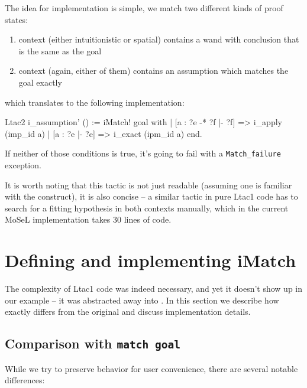 The idea for implementation is simple, we match two different kinds of proof states:
\begin{enumerate}
\item context (either intuitionistic or spatial) contains a wand with conclusion that is the same as the goal
\item context (again, either of them) contains an assumption which matches the goal exactly
\end{enumerate}

which translates to the following implementation:

\begin{minipage}{\linewidth}
\begin{coq}
Ltac2 i_assumption' () :=
  iMatch! goal with
  | [a : ?e -* ?f |- ?f] => i_apply (imp_id a)
  | [a : ?e |- ?e] => i_exact (ipm_id a)
  end.
\end{coq}
\end{minipage}

If neither of those conditions is true, it's going to fail with a {\color{red} \texttt{Match\_failure}} exception.

It is worth noting that this tactic is not just readable (assuming one is familiar with the  construct), it is also concise -- a similar tactic in pure Ltac1 code has to search for a fitting hypothesis in both contexts manually, which in the current MoSeL implementation takes 30 lines of code.

\section{Defining and implementing iMatch}
\label{sec:defin-impl-imatch}

The complexity of Ltac1 code was indeed necessary, and yet it doesn't show up in our example -- it was abstracted away into .
In this section we describe how exactly  differs from the original  and discuss implementation details.

\subsection{Comparison with \texttt{match goal}}

While we try to preserve  behavior for user convenience, there are several notable differences:

